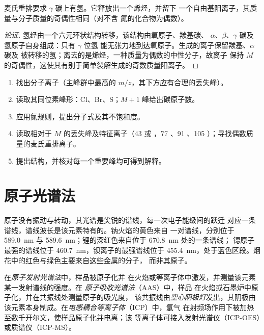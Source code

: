 \begin{proposition}[麦氏重排的条件]\label{prop:b2:mass-spec-atomic:mclafferty}
麦氏重排要求 $\gamma$ 碳上有氢。它释放出一个烯烃，并留下
一个自由基阳离子，其质量与分子质量的奇偶性相同（对不含
氮的化合物为偶数）。
\end{proposition}

\begin{proof}[论证]
氢经由一个六元环状结构转移，该结构由氧原子、羰基碳、
$\alpha$、$\beta$、$\gamma$ 碳及氢原子自身组成：只有 $\gamma$ 位氢
能无张力地到达氧原子。生成的离子保留羰基、$\alpha$ 碳及
被转移的氢；离去的是烯烃，一种质量为偶数的中性分子，故离子
保持 $M$ 的奇偶性，这使其有别于简单裂解生成的奇数质量阳离子。
\end{proof}

\begin{method}[读取质谱图]\label{met:b2:mass-spec-atomic:read-ms}
\begin{enumerate}
  \item 找出分子离子（主峰群中最高的 $m/z$，其下方应有合理的丢失峰）。
  \item 读取其同位素峰形：Cl、Br、S；$M+1$ 峰给出碳原子数。
  \item 应用氮规则，提出分子式及其不饱和度。
  \item 读取相对于 $M$ 的丢失峰及特征离子（43  或 ，77
        、91 、105 ）；寻找偶数质量的麦氏重排离子。
  \item 提出结构，并核对每一个重要峰均可得到解释。
\end{enumerate}
\end{method}

\section{原子光谱法}

原子没有振动与转动，其光谱是尖锐的谱线，每一次电子能级间的跃迁
对应一条谱线，谱线波长是该元素特有的。钠火焰的黄色来自
一对谱线，分别位于 \qty{589.0}{nm} 与 \qty{589.6}{nm}；锂的深红色来自位于 \qty{670.8}{nm} 处的一条谱线；
锶原子最强的谱线位于 \qty{460.7}{nm}，钡离子的最强谱线位于
\qty{455.4}{nm}，处于蓝色区段。烟花中的红色与绿色主要来自这些金属的分子，
而非其原子。

\begin{definition}[原子光谱法]\label{def:b2:mass-spec-atomic:atomic}
在\emph{原子发射光谱法}中，样品被原子化并
在火焰或等离子体中激发，并测量该元素某一发射谱线的强度。在
\emph{原子吸收光谱法}（AAS）中，样品
在火焰或石墨炉中原子化，并在共振线处测量原子的吸光度，
该共振线由\emph{空心阴极灯}发出，其阴极由
该元素本身制成。在\emph{电感耦合等离子体}（ICP）中，氩气
在射频场作用下被加热至数千开尔文，使样品原子化并电离；该
等离子体可接入发射光谱仪（ICP-OES）或质谱仪（ICP-MS）。
\end{definition}

